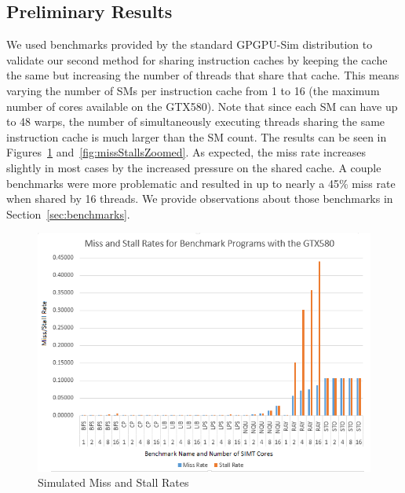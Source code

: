 \subsection{Preliminary Results}

We used benchmarks provided by the standard GPGPU-Sim distribution
to validate our second method for sharing instruction caches by
keeping the cache the same but increasing the number of threads that
share that cache.
This means varying the number of SMs per instruction cache from 1 to
16 (the maximum number of cores available on the GTX580).
Note that since each SM can have up to 48 warps, the number of
simultaneously executing threads sharing the same instruction cache is
much larger than the SM count.
The results can be seen in Figures~\ref{fig:missStalls}
and~\ref{fig:missStallsZoomed}. 
As expected, the miss rate increases slightly in most cases by the
increased pressure on the shared cache.
A couple benchmarks were more problematic and resulted in up to nearly
a 45\% miss rate when shared by 16 threads.
We provide observations about those benchmarks in
Section~\ref{sec:benchmarks}.

\begin{figure}
\centering
\includegraphics[width=\columnwidth]{graphics/miss_stalls_benchmarks.png}
\caption{Simulated Miss and Stall Rates
}
\label{fig:missStalls}
\end{figure}

